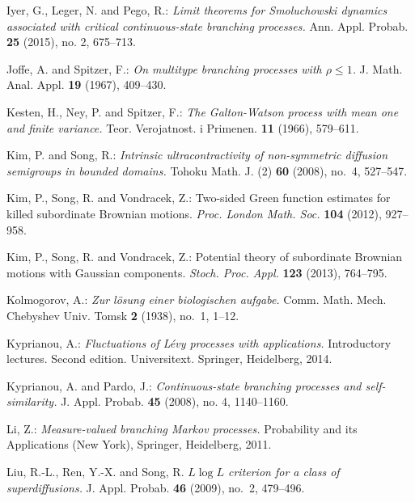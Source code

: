\documentclass[12pt,a4paper]{amsart}
\theoremstyle{definition}
\numberwithin{equation}{section}
\begin{document}
\begin{thebibliography}{10}
	
	Iyer, G., Leger, N. and Pego, R.:
	\emph{Limit theorems for Smoluchowski dynamics associated with critical continuous-state branching processes.}
	Ann. Appl. Probab. \textbf{25} (2015), no. 2, 675–713.

	
	Joffe, A. and Spitzer, F.:
	\emph{On multitype branching processes with {$\rho \leq 1$}.}
	J. Math. Anal. Appl. \textbf{19} (1967), 409--430.
	
	
	Kesten, H., Ney, P. and Spitzer, F.:
	\emph{The {G}alton-{W}atson process with mean one and finite variance.}
	Teor. Verojatnost. i Primenen. \textbf{11} (1966), 579--611.
	
	
	Kim, P. and Song, R.:
	\emph{Intrinsic ultracontractivity of non-symmetric diffusion semigroups in bounded domains.}
	Tohoku Math. J. (2) \textbf{60} (2008), no.~4, 527--547.

 Kim, P., Song, R. and Vondracek, Z.:
Two-sided Green function estimates for killed subordinate Brownian motions.
\emph{Proc. London Math. Soc.} \textbf{104} (2012), 927--958.

 Kim, P., Song, R. and Vondracek, Z.:
Potential theory of subordinate Brownian motions with Gaussian components.
\emph{Stoch. Proc. Appl.} \textbf{123} (2013), 764--795.
	
	Kolmogorov, A.:
	\emph{Zur l{\"o}sung einer biologischen aufgabe.}
	Comm. Math. Mech. Chebyshev Univ. Tomsk \textbf{2} (1938), no.~1, 1--12.
	
	Kyprianou, A.:
	\emph{Fluctuations of Lévy processes with applications.}
	Introductory lectures. Second edition. Universitext. Springer, Heidelberg, 2014.
	
	
	Kyprianou, A. and Pardo, J.:
	\emph{Continuous-state branching processes and self-similarity.}
	J. Appl. Probab. \textbf{45} (2008), no. 4, 1140–1160.


	Li, Z.:
	\emph{Measure-valued branching {M}arkov processes.}
	Probability and its Applications (New York), Springer, Heidelberg, 2011.

	
  Liu, R.-L., Ren, Y.-X. and Song, R.
	\emph{{$L\log L$} criterion for a class of superdiffusions.}
	J. Appl. Probab. \textbf{46} (2009), no.~2, 479--496.


\end{thebibliography}
\end{document}
